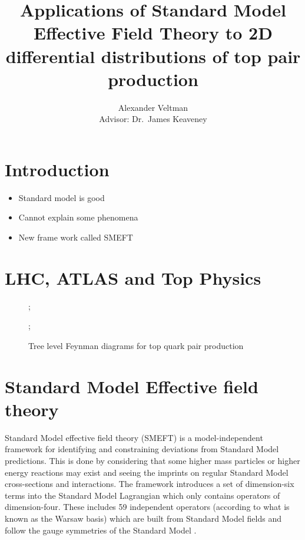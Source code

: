 \documentclass[a4paper,11pt]{article}
\title{Applications of Standard Model Effective Field Theory to 2D differential distributions of top pair production}
\author{Alexander Veltman\\{\small Advisor: Dr.\ James Keaveney}}
\affil{Department of Physics,\\University of Cape Town}
\begin{document}
\maketitle

\begin{abstract}
\end{abstract}

\section{Introduction}

\begin{itemize}
    \item Standard model is good
    \item Cannot explain some phenomena
    \item New frame work called SMEFT
\end{itemize}

\section{LHC, ATLAS and Top Physics}

\begin{figure}[htb]
    \centering
    ;

    ;
    \caption{Tree level Feynman diagrams for top quark pair production}
\end{figure}


\section{Standard Model Effective field theory}

Standard Model effective field theory (SMEFT) is a model-independent framework for identifying and constraining deviations from Standard Model predictions.
This is done by considering that some higher mass particles or higher energy reactions may exist and seeing the imprints on regular Standard Model cross-sections and interactions.
The framework introduces a set of dimension-six terms into the Standard Model Lagrangian which only contains operators of dimension-four.
These includes 59 independent operators (according to what is known as the Warsaw basis) which are built from Standard Model fields and follow the gauge symmetries of the Standard Model \cite{Grzadkowski_2010}.
\end{document}
